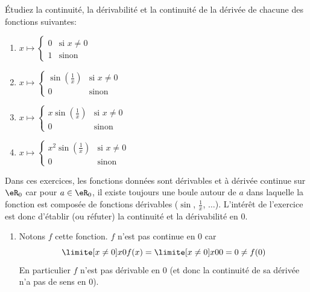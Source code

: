 \begin{example}\label{EXOooMWGTooLZpgxM}\label{exo0035}

	Étudiez la continuité, la dérivabilité et la continuité de la dérivée de chacune des fonctions suivantes:
	\begin{enumerate}
		\item $x \mapsto \left\{ \begin{array}{ll} 0 & \mbox{si } x \not= 0 \\ 1 & \mbox{sinon} \end{array} \right.  $
		\item $x \mapsto \left\{ \begin{array}{ll} \sin(\frac{1}{x}) & \mbox{si } x \not= 0 \\ 0 & \mbox{sinon} \end{array} \right.  $
		\item $x \mapsto \left\{ \begin{array}{ll} x \sin(\frac{1}{x}) & \mbox{si } x \not= 0 \\ 0 & \mbox{sinon} \end{array} \right. $
		\item\label{Item0035d} $x \mapsto \left\{ \begin{array}{ll} x^2 \sin(\frac{1}{x}) & \mbox{si } x \not= 0 \\ 0 & \mbox{sinon} \end{array} \right.  $
	\end{enumerate}

	Dans ces exercices, les fonctions données sont dérivables et à dérivée
	continue sur $\eR_0$ car pour $a \in \eR_0$, il existe toujours une
	boule autour de $a$ dans laquelle la fonction est composée de
	fonctions dérivables ($\sin$, $\frac 1x$, $\ldots$). L'intérêt de
	l'exercice est donc d'établir (ou réfuter) la continuité et la
	dérivabilité en $0$.

	\begin{enumerate}

		\item
		      Notons $f$ cette fonction. $f$ n'est pas continue en $0$ car
		      \begin{equation*}
			      \limite[x \neq 0] x 0 f(x) = \limite[x \neq 0] x 0 0 = 0 \neq f(0)
		      \end{equation*}
		      En particulier $f$ n'est pas dérivable en $0$ (et donc la continuité
		      de sa dérivée n'a pas de sens en $0$).


\end{enumerate}
\end{example}
